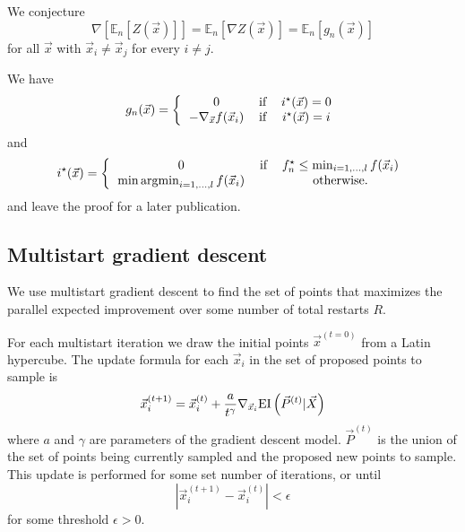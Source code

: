 We conjecture
\begin{equation}
    \nabla \left[\mathbb{E}_{n}\left[Z \left(\vec{x}\right)\right]\right] = \mathbb{E}_{n}\left[\nabla Z \left(\vec{x}\right)\right] =  \mathbb{E}_{n}\left[g_{n}(\vec{x})\right]
\end{equation}
for all $\vec{x}$ with $\vec{x}_{i} \neq \vec{x}_{j}$ for every $i \neq j$.

We have
\begin{equation}
    g_{n}(\vec{x}) = \left\{ \begin{tabular}{ccc}
        0 & if & $i^{\star}(\vec{x}) = 0$ \\
        $-\nabla_{\vec{x}} f(\vec{x}_{i})$ & if & $i^{\star}(\vec{x}) = i$
    \end{tabular} \right.
\end{equation}
and
\begin{equation}
    i^{\star}(\vec{x}) = \left\{ \begin{tabular}{ccc}
        0 & if & $f_{n}^{\star} \leq \min_{i=1,\ldots,l} f(\vec{x}_{i})$ \\
        $\min \argmin_{i=1,\ldots,l} f(\vec{x}_{i})$ & & otherwise.
    \end{tabular} \right.
\end{equation}
and leave the proof for a later publication.

\subsection{Multistart gradient descent}
\label{sec:multistart}

We use multistart gradient descent to find the set of points that maximizes the parallel expected improvement over some number of total restarts $R$.

For each multistart iteration we draw the initial points $\vec{x}^{(t=0)}$ from a Latin hypercube. The update formula for each $\vec{x}_{i}$ in the set of proposed points to sample is
\begin{equation}
    \vec{x}_{i}^{(t+1)} = \vec{x}_{i}^{(t)} + \frac{a}{t^{\gamma}} \nabla_{\vec{x}_{i}} {\rm EI}\left(\vec{P}^{(t)} | \vec{X}\right)
\end{equation}
where $a$ and $\gamma$ are parameters of the gradient descent model. $\vec{P}^{(t)}$ is the union of the set of points being currently sampled and the proposed new points to sample. This update is performed for some set number of iterations, or until
\begin{equation}
    \left|\vec{x}_{i}^{(t+1)} - \vec{x}_{i}^{(t)}\right| < \epsilon
\end{equation}
for some threshold $\epsilon > 0$.

